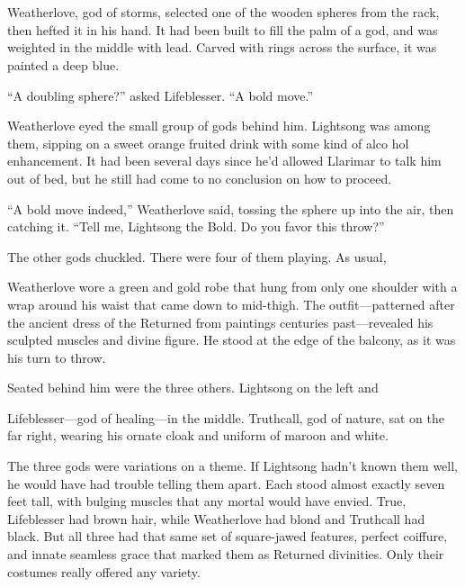 \chapter{}

Weatherlove, god of storms, selected one of the wooden spheres from the rack, then hefted it in his hand. It had been built to fill the palm of a god, and was weighted in the middle with lead. Carved with rings across the surface, it was painted a deep blue.

“A doubling sphere?” asked Lifeblesser. “A bold move.”

Weatherlove eyed the small group of gods behind him. Lightsong was among them, sipping on a sweet orange fruited drink with some kind of alco hol enhancement. It had been several days since he’d allowed Llarimar to talk him out of bed, but he still had come to no conclusion on how to proceed.

“A bold move indeed,” Weatherlove said, tossing the sphere up into the air, then catching it. “Tell me, Lightsong the Bold. Do you favor this throw?”

The other gods chuckled. There were four of them playing. As usual,

Weatherlove wore a green and gold robe that hung from only one shoulder with a wrap around his waist that came down to mid-thigh. The outfit—patterned after the ancient dress of the Returned from paintings centuries past—revealed his sculpted muscles and divine figure. He stood at the edge of the balcony, as it was his turn to throw.

Seated behind him were the three others. Lightsong on the left and

Lifeblesser—god of healing—in the middle. Truthcall, god of nature, sat on the far right, wearing his ornate cloak and uniform of maroon and white.

The three gods were variations on a theme. If Lightsong hadn’t known them well, he would have had trouble telling them apart. Each stood almost exactly seven feet tall, with bulging muscles that any mortal would have envied. True, Lifeblesser had brown hair, while Weatherlove had blond and Truthcall had black. But all three had that same set of square-jawed features, perfect coiffure, and innate seamless grace that marked them as Returned divinities. Only their costumes really offered any variety.

